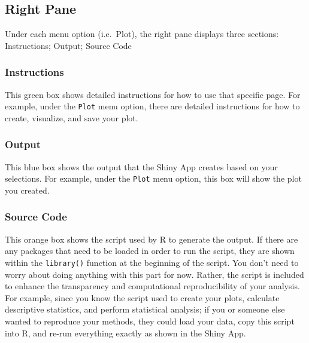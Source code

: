 \documentclass[
]{book}
\begin{document}
\hypertarget{right-pane}{%
\subsection*{Right Pane}\label{right-pane}}

Under each menu option (i.e.~Plot), the right pane displays three sections: Instructions; Output; Source Code

\hypertarget{instructions}{%
\subsubsection*{Instructions}\label{instructions}}

This green box shows detailed instructions for how to use that specific page. For example, under the \texttt{Plot} menu option, there are detailed instructions for how to create, visualize, and save your plot.

\hypertarget{output}{%
\subsubsection*{Output}\label{output}}

This blue box shows the output that the Shiny App creates based on your selections. For example, under the \texttt{Plot} menu option, this box will show the plot you created.

\hypertarget{source-code}{%
\subsubsection*{Source Code}\label{source-code}}

This orange box shows the script used by R to generate the output. If there are any packages that need to be loaded in order to run the script, they are shown within the \texttt{library()} function at the beginning of the script. You don't need to worry about doing anything with this part for now. Rather, the script is included to enhance the transparency and computational reproducibility of your analysis. For example, since you know the script used to create your plots, calculate descriptive statistics, and perform statistical analysis; if you or someone else wanted to reproduce your methods, they could load your data, copy this script into R, and re-run everything exactly as shown in the Shiny App.
\end{document}
